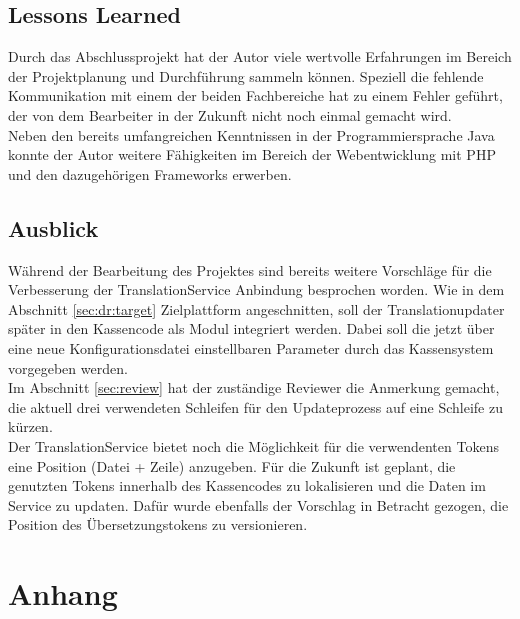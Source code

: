 \documentclass[10pt, oneside, ngerman]{article}
\begin{document}
    \subsection{Lessons Learned}
    Durch das Abschlussprojekt hat der Autor viele wertvolle Erfahrungen im Bereich der Projektplanung und Durchführung sammeln können. Speziell die fehlende Kommunikation
    mit einem der beiden Fachbereiche hat zu einem Fehler geführt, der von dem Bearbeiter in der Zukunft nicht noch einmal gemacht wird.\\ 
    Neben den bereits umfangreichen Kenntnissen in der Programmiersprache Java konnte der Autor weitere Fähigkeiten im Bereich der Webentwicklung mit PHP und den dazugehörigen Frameworks erwerben. 
    \subsection{Ausblick}\label{sec:future}
    Während der Bearbeitung des Projektes sind bereits weitere Vorschläge für die Verbesserung der TranslationService Anbindung besprochen worden. 
    Wie in dem Abschnitt \ref{sec:dr:target} Zielplattform angeschnitten, soll der Translationupdater später in den Kassencode als Modul integriert werden. Dabei 
    soll die jetzt über eine neue Konfigurationsdatei einstellbaren Parameter durch das Kassensystem vorgegeben werden.\\
    Im Abschnitt \ref{sec:review} hat der zuständige Reviewer die Anmerkung gemacht, die aktuell drei verwendeten Schleifen für den Updateprozess auf 
    eine Schleife zu kürzen.\\
    Der TranslationService bietet noch die Möglichkeit für die verwendenten Tokens eine Position (Datei + Zeile) anzugeben. Für die Zukunft ist geplant, die genutzten 
    Tokens innerhalb des Kassencodes zu lokalisieren und die Daten im Service zu updaten. Dafür wurde ebenfalls der Vorschlag in Betracht gezogen, die Position des
    Übersetzungstokens zu versionieren.
  \newpage
  \setcounter{section}{0}
  \setcounter{page}{1}
  \renewcommand{\thesection}{\MakeUppercase{\alph{section}}}
  \section{Anhang}
\end{document}

